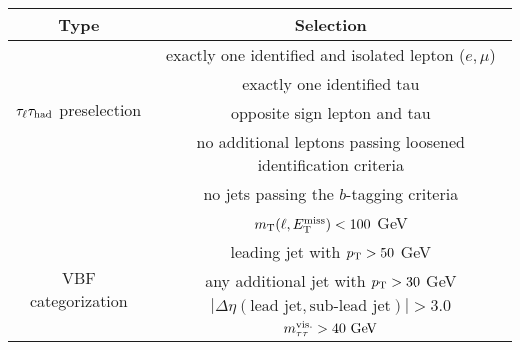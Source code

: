 \begin{tabular}{c|c}
  Type                                      & Selection                                                      \\
  \hline\hline
  \multirow{4}{*}{$\tau_\ell\tau_\text{had}$ preselection} & exactly one identified and isolated lepton ($e,\mu$)           \\
                                            & exactly one identified tau                                     \\
                                            & opposite sign lepton and tau                                   \\
                                            & no additional leptons passing loosened identification criteria \\
                                            & no jets passing the $b$-tagging criteria                       \\
                                            & $m_\text{T}(\ell, E_{\mathrm{T}}^{\mathrm{miss}}) < 100$ GeV                                                \\
  \hline
  \multirow{4}{*}{VBF categorization}       & leading jet with $p_{\mathrm{T}} > 50$ GeV                                \\
                                            & any additional jet with $p_{\mathrm{T}} > 30$ GeV                         \\
                                            & $|\Delta\eta(\text{lead jet}, \text{sub-lead jet})| > 3.0$     \\
                                            & $\mvis > 40 \GeV$ \\
\end{tabular}


